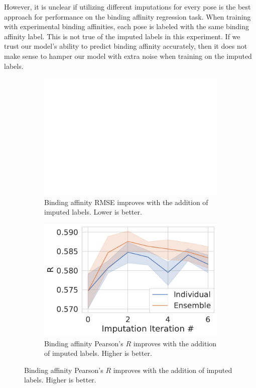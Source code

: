 \documentclass[journal=jmcmar,manuscript=article]{achemso}
\begin{document}
However, it is unclear if utilizing different imputations for every pose is the best approach for performance on the binding affinity regression task.
When training with experimental binding affinities, each pose is labeled with the same binding affinity label.
This is not true of the imputed labels in this experiment.
If we trust our model's ability to predict binding affinity accurately, then it does not make sense to hamper our model with extra noise when training on the imputed labels.

\begin{figure}[tbph]
    \centering
    \begin{subfigure}[t]{0.48\textwidth}
        \centering
        \includegraphics[width=\linewidth]{figures/InitialImpRMSE.pdf}
        \caption{Binding affinity RMSE improves with the addition of imputed labels. Lower is better.}
    \end{subfigure}
    \hfill
    \begin{subfigure}[t]{0.48\textwidth}
        \centering
        \includegraphics[width=\linewidth]{figures/InitialImpR.pdf}
        \caption{Binding affinity Pearson's $R$ improves with the addition of imputed labels. Higher is better.}
    \end{subfigure}


\end{figure}
\end{document}
